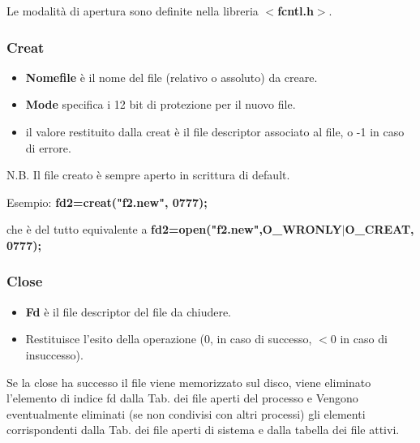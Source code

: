 \documentclass{article}
\begin{document}
 \noindent Le modalità di apertura sono definite nella libreria
 \textbf{$<$fcntl.h$>$}.

 \subsubsection{Creat}
 \noindent {} 
 \medskip

 \begin{itemize}
     \item \textbf{Nomefile} è il nome del file (relativo o 
     assoluto) da creare.
     \item  \textbf{Mode} specifica i 12 bit di protezione 
     per il nuovo file.
     \item il valore restituito dalla creat è il file descriptor
     associato al file, o -1 in caso di errore.
 \end{itemize}

\noindent N.B. Il file creato è sempre aperto in scrittura di default.

\noindent Esempio: \textbf{fd2=creat("f2.new", 0777);} 

\noindent che è del tutto equivalente a
\textbf{fd2=open("f2.new",O\_WRONLY$|$O\_CREAT, 0777);}

\subsubsection{Close}
\noindent {} 
\medskip

\begin{itemize}
    \item \textbf{Fd} è il file descriptor del file da chiudere.
    \item Restituisce l'esito della operazione (0, in caso di
    successo, $<$0 in caso di insuccesso).
\end{itemize}

\noindent Se la close ha successo il file viene memorizzato sul disco,
viene eliminato l'elemento di indice fd dalla Tab. dei file
aperti del processo e Vengono eventualmente eliminati (se non 
condivisi con altri processi) gli elementi corrispondenti dalla Tab. dei
file aperti di sistema e dalla tabella dei file attivi.
\end{document}
